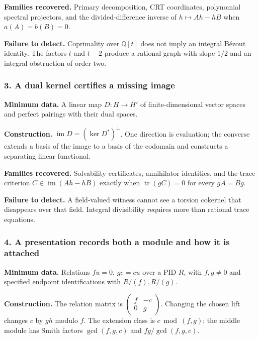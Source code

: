 \documentclass[
  11pt,
]{article}
\begin{document}
\textbf{Families recovered.} Primary decomposition, CRT coordinates,
polynomial spectral projectors, and the divided-difference inverse of
\(h\mapsto Ah-hB\) when \(a(A)=b(B)=0\).

\textbf{Failure to detect.} Coprimality over \(\mathbb Q[t]\) does not
imply an integral Bézout identity. The factors \(t\) and \(t-2\) produce
a rational graph with slope \(1/2\) and an integral obstruction of order
two.

\subsubsection*{3. A dual kernel certifies a missing
image}\label{a-dual-kernel-certifies-a-missing-image}

\textbf{Minimum data.} A linear map \(D:H\to H'\) of finite-dimensional
vector spaces and perfect pairings with their dual spaces.

\textbf{Construction.} \(\operatorname{im}D=(\ker D^*)^\perp\). One
direction is evaluation; the converse extends a basis of the image to a
basis of the codomain and constructs a separating linear functional.

\textbf{Families recovered.} Solvability certificates, annihilator
identities, and the trace criterion \(C\in\operatorname{im}(Ah-hB)\)
exactly when \(\operatorname{tr}(gC)=0\) for every \(gA=Bg\).

\textbf{Failure to detect.} A field-valued witness cannot see a torsion
cokernel that disappears over that field. Integral divisibility requires
more than rational trace equations.

\subsubsection*{4. A presentation records both a module and how it is
attached}\label{a-presentation-records-both-a-module-and-how-it-is-attached}

\textbf{Minimum data.} Relations \(fu=0\), \(ge=cu\) over a PID \(R\),
with \(f,g\ne0\) and specified endpoint identifications with
\(R/(f),R/(g)\).

\textbf{Construction.} The relation matrix is
\(\left(\begin{smallmatrix}f&-c\\0&g\end{smallmatrix}\right)\). Changing
the chosen lift changes \(c\) by \(gh\) modulo \(f\). The extension
class is \(c\bmod(f,g)\); the middle module has Smith factors
\(\gcd(f,g,c)\) and \(fg/\gcd(f,g,c)\).
\end{document}
